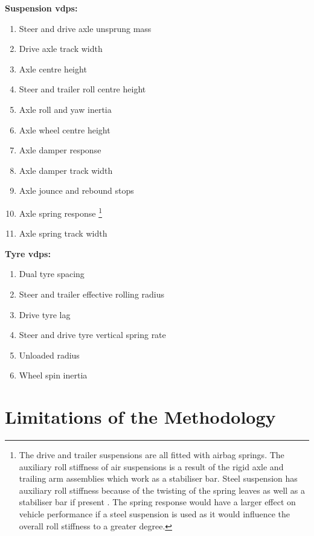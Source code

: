 \textbf{Suspension \glspl{vdp}:}
\begin{enumerate}
	\item Steer and drive axle unsprung mass
	\item Drive axle track width
	\item Axle centre height
	\item Steer and trailer roll centre height
	\item Axle roll and yaw inertia
	\item Axle wheel centre height
	\item Axle damper response
	\item Axle damper track width
	\item Axle jounce and rebound stops
	\item Axle spring response \footnote{The drive and trailer suspensions are all fitted with airbag springs. The auxiliary roll stiffness of air suspensions is a result of the rigid axle and trailing arm assemblies which work as a stabiliser bar. Steel suspension has auxiliary roll stiffness because of the twisting of the spring leaves as well as a stabiliser bar if present \cite{Fu2002}. The spring response would have a larger effect on vehicle performance if a steel suspension is used as it would influence the overall roll stiffness to a greater degree.}
	\item Axle spring track width
\end{enumerate}

\textbf{Tyre \glspl{vdp}:}
\begin{enumerate}
	\item Dual tyre spacing
	\item Steer and trailer effective rolling radius
	\item Drive tyre lag
	\item Steer and drive tyre vertical spring rate
	\item Unloaded radius
	\item Wheel spin inertia
\end{enumerate}

\section{Limitations of the Methodology}\label{section:discussion-methodology-limitations}

